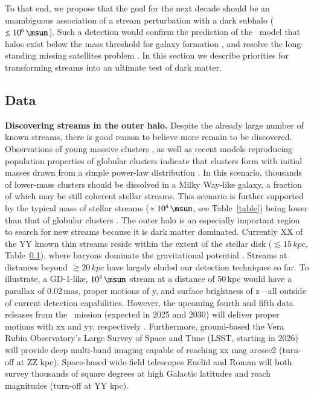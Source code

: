 \documentclass[final,5p,times,twocolumn,authoryear]{elsarticle}
\begin{document}
To that end, we propose that the goal for the next decade should be an unambiguous association of a stream perturbation with a dark subhalo ($\lesssim10^6\,\unit{\msun}$).
Such a detection would confirm the prediction of the \lcdm\ model that halos exist below the mass threshold for galaxy formation \citep{bullock:2000, benson:2002, somerville:2002, benitez-llambay:2020}, and resolve the long-standing missing satellites problem \citep{klypin:1999}.
In this section we describe priorities for transforming streams into an ultimate test of dark matter.


\subsection{Data}
\textbf{Discovering streams in the outer halo.} Despite the already large number of known streams, there is good reason to believe more remain to be discovered.
Observations of young massive clusters \citep[e.g.,][]{portegies-zwart:2010}, as well as recent models reproducing population properties of globular clusters indicate that clusters form with initial masses drawn from a simple power-law distribution \citep[e.g.,][]{choksi:2018,chen:2023}.
In this scenario, thousands of lower-mass clusters should be dissolved in a Milky Way-like galaxy, a fraction of which may be still coherent stellar streams.
This scenario is further supported by the typical mass of stellar streams ($\approx10^4\,\unit{\msun}$, see Table~\ref{table}) being lower than that of globular clusters \citep[$\approx10^5\,\unit{\msun}$,][]{baumgardt}.
The outer halo is an especially important region to search for new streams because it is dark matter dominated.
Currently XX of the YY known thin streams reside within the extent of the stellar disk ($\lesssim15\,\unit{kpc}$, Table~\ref{}), where baryons dominate the gravitational potential \citep[e.g.,][]{mcmillan:2017}.
Streams at distances beyond $\gtrsim20\,\unit{kpc}$ have largely eluded our detection techniques so far.
To illustrate, a GD-1-like, $10^4\,\unit{\msun}$ stream at a distance of 50\,\unit{kpc} would have a parallax of 0.02\,\unit{mas}, proper motions of y, and surface brightness of z---all outside of current detection capabilities.
However, the upcoming fourth and fifth data releases from the \gaia\ mission (expected in 2025 and 2030) will deliver proper motions with xx and yy, respectively \citep{forecast}.
Furthermore, ground-based the Vera Rubin Observatory's Large Survey of Space and Time (LSST, starting in 2026) will provide deep multi-band imaging capable of reaching xx mag arcsec2 \citep{ivezic:2008} (turn-off at ZZ kpc).
Space-based wide-field telescopes Euclid \citep[launched in 2023]{laureijs:2011} and Roman \citep[to launch in 2027]{spergel:2013} will both survey thousands of square degrees at high Galactic latitudes and reach magnitudes (turn-off at YY kpc).
\end{document}
